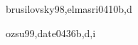 \begin{syllabus}
\begin{unit}{\IMInformationStorageandRetrieval}{}{brusilovsky98,elmasri04}{10}{b,d}
    \IMInformationStorageandRetrievalAllTopics
    \IMInformationStorageandRetrievalAllLearningOutcomes
\end{unit}

\begin{unit}{\IMDistributedDatabases}{}{ozsu99,date04}{36}{b,d,i}
    \IMDistributedDatabasesAllTopics
    \IMDistributedDatabasesAllLearningOutcomes
\end{unit}


\begin{coursebibliography}
\end{coursebibliography}

\end{syllabus}

%
